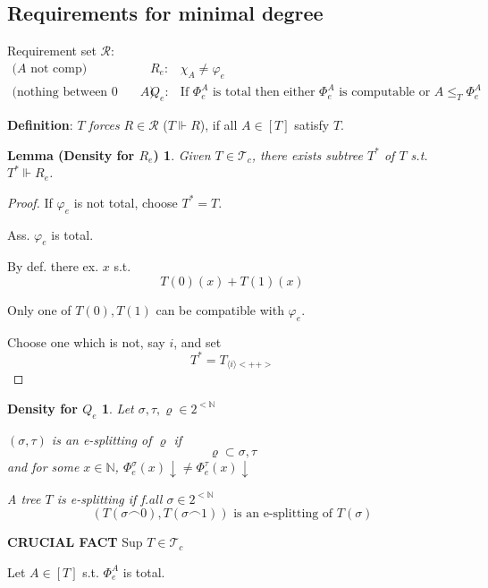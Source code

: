 \documentclass[12pt]{article}
\newcommand{\Nat}{\ensuremath{\mathbb{N}}}
\newcommand{\defn}{\textbf{Definition}: }
\begin{document}
\subsection{Requirements for minimal degree}

Requirement set $\mathcal{R}$:
\begin{align*}
\text{($A$ not comp) }  
  &R_e:& \chi_A \ne \varphi_e \\
\text{(nothing between 0 and $A$) }  
  &Q_e:& \text{If } \Phi^A_e \text{ is total then either }
        \Phi^A_e \text{ is computable or } A \le_T \Phi^A_e
\end{align*}

\newcommand{\forces}{\Vdash}
\defn $T$ \emph{forces} $R \in \mathcal{R}$ ($T \forces R$), 
if all $A \in [T]$ satisfy $T$.

\newtheorem{densitylem}{Lemma (Density for $R_e$)}
\begin{densitylem}
  Given $T \in \mathcal{T}_c$, there exists subtree $T^*$ of $T$
  s.t. $T^* \forces R_e$.
\end{densitylem}
\begin{proof}
  If $\varphi_e$ is not total, choose $T^* = T$.

  Ass. $\varphi_e$ is total.

  By def. there ex. $x$ s.t.
  \[
      T(0)    (x) + T(1)(x)
  \] %

  Only one of $T(0), T(1)$ can be compatible with $\varphi_e$.

  Choose one which is not, say $i$, and set
  \[
  T^* = T_{\langle i\rangle<++>} %
  \]
\end{proof}

\newtheorem{densityqe}{Density for $Q_e$}
\begin{densityqe}
  Let $\sigma,\tau,\varrho \in 2^{<\Nat}$

  $(\sigma,\tau)$ is an \emph{e-splitting} of $\varrho$ if
  \[
  \varrho \subset \sigma,\tau
  \]
  and for some $ x \in \Nat$, 
  $\Phi^\sigma_e(x)\downarrow \ne \Phi^\tau_e(x)\downarrow$


  A tree $T$ is \emph{e-splitting} if f.all $\sigma\in 2^{<\Nat}$
  \[
       \left(
        T(\sigma\frown 0), T(\sigma\frown 1)
        \right) \text{ is an e-splitting of $T(\sigma)$}
  \]
\end{densityqe}

\textbf{CRUCIAL FACT}
Sup $T \in \mathcal{T}_c$

Let $A \in [T]$ s.t. $\Phi^A_e$ is  total.
\end{document}
